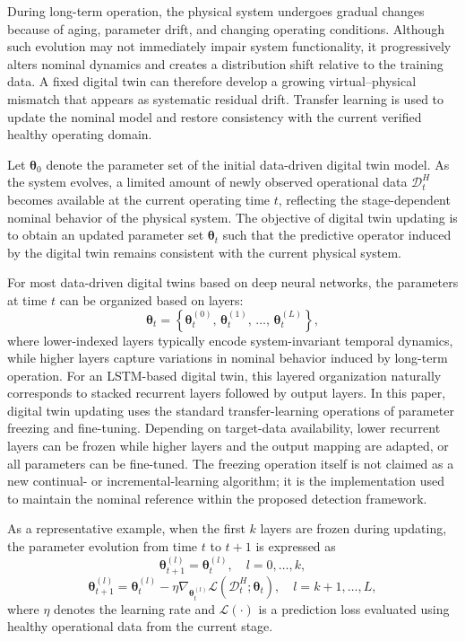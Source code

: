 \documentclass[a4paper,10pt]{cas-sc}%
\newcommand{\rev}[1]{\textcolor{revisionred}{#1}}
\begin{document}
During long-term operation, the physical system undergoes gradual changes because of aging, parameter drift, and changing operating conditions. Although such evolution may not immediately impair system functionality, it progressively alters nominal dynamics and creates a distribution shift relative to the training data. A fixed digital twin can therefore develop a growing virtual--physical mismatch that appears as systematic residual drift. Transfer learning is used to update the nominal model and restore consistency with the current verified healthy operating domain.

Let $\boldsymbol{\theta}_0$ denote the parameter set of the initial data-driven digital twin model. As the system evolves, a limited amount of newly observed operational data $\mathcal{D}_t^{H}$ becomes available at the current operating time $t$, reflecting the stage-dependent nominal behavior of the physical system. The objective of digital twin updating is to obtain an updated parameter set $\boldsymbol{\theta}_t$ such that the predictive operator induced by the digital twin remains consistent with the current physical system.

For most data-driven digital twins based on deep neural networks, the parameters at time $t$ can be organized based on layers:
\begin{equation}
	\boldsymbol{\theta}_t
	=
	\left\{
	\boldsymbol{\theta}_t^{(0)},\,
	\boldsymbol{\theta}_t^{(1)},\,
	\dots,\,
	\boldsymbol{\theta}_t^{(L)}
	\right\},
\end{equation}
where lower-indexed layers typically encode system-invariant temporal dynamics, while higher layers capture variations in nominal behavior induced by long-term operation. For an LSTM-based digital twin, this layered organization naturally corresponds to stacked recurrent layers followed by output layers.
\rev{In this paper, digital twin updating uses the standard transfer-learning operations of parameter freezing and fine-tuning. Depending on target-data availability, lower recurrent layers can be frozen while higher layers and the output mapping are adapted, or all parameters can be fine-tuned. The freezing operation itself is not claimed as a new continual- or incremental-learning algorithm; it is the implementation used to maintain the nominal reference within the proposed detection framework.}

As a representative example, when the first $k$ layers are frozen during updating, the parameter evolution from time $t$ to $t+1$ is expressed as
\begin{equation}
	\boldsymbol{\theta}_{t+1}^{(l)} = \boldsymbol{\theta}_{t}^{(l)},
	\quad l = 0, \dots, k,
\end{equation}
\begin{equation}
	\boldsymbol{\theta}_{t+1}^{(l)}
	=
	\boldsymbol{\theta}_{t}^{(l)}
	-
	\eta
	\nabla_{\boldsymbol{\theta}_{t}^{(l)}}
	\mathcal{L}\!\left(\mathcal{D}_t^{H}; \boldsymbol{\theta}_{t}\right),
	\quad l = k+1, \dots, L,
\end{equation}
where $\eta$ denotes the learning rate and $\mathcal{L}(\cdot)$ is a prediction loss evaluated using healthy operational data from the current stage.
\end{document}
